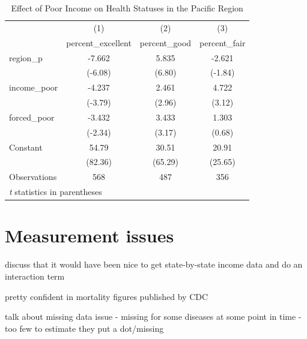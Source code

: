 \documentclass[12pt]{article}
\begin{document}
\begin{table}[htbp]\centering \caption{Effect of Poor Income on Health Statuses in the Pacific Region\label{ppoor}} \begin{tabular}{l*{3}{c}} \toprule
                    &\multicolumn{1}{c}{(1)}&\multicolumn{1}{c}{(2)}&\multicolumn{1}{c}{(3)}\\
                    &\multicolumn{1}{c}{percent\_excellent}&\multicolumn{1}{c}{percent\_good}&\multicolumn{1}{c}{percent\_fair}\\
\midrule
region\_p            &      -7.662&       5.835&      -2.621\\
                    &     (-6.08)&      (6.80)&     (-1.84)\\
\addlinespace
income\_poor         &      -4.237&       2.461&       4.722\\
                    &     (-3.79)&      (2.96)&      (3.12)\\
\addlinespace
forced\_poor         &      -3.432&       3.433&       1.303\\
                    &     (-2.34)&      (3.17)&      (0.68)\\
\addlinespace
Constant            &       54.79&       30.51&       20.91\\
                    &     (82.36)&     (65.29)&     (25.65)\\
\midrule
Observations        &         568&         487&         356\\
\bottomrule
\multicolumn{4}{l}{\footnotesize \textit{t} statistics in parentheses}\\
\end{tabular}
\end{table}


\section{Measurement issues}
discuss that it would have been nice to get state-by-state income data and do an interaction term

pretty confident in mortality figures published by CDC

talk about missing data issue - missing for some diseases at some point in time - too few to estimate they put a dot/missing
\end{document}
